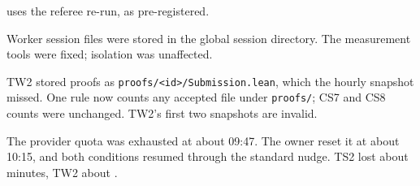 \documentclass[11pt]{article}
\begin{document}
\begin{description}
    uses the referee re-run, as pre-registered.
  \item[D9 (CS9).] Worker session files were stored in the global session directory. The measurement tools were fixed;
    isolation was unaffected.
  \item[D10 (CS9).] TW2 stored proofs as \texttt{proofs/<id>/Submission.lean}, which the hourly snapshot missed. One
    rule now counts any accepted file under \texttt{proofs/}; CS7 and CS8 counts were unchanged. TW2's first two
    snapshots are invalid.
  \item[D11 (CS9).] The provider quota was exhausted at about 09:47. The owner reset it at about 10:15, and both
    conditions resumed through the standard nudge. TS2 lost about \CSnineLossTS{} minutes, TW2 about \CSnineLossTW.
\end{description}
\end{document}
